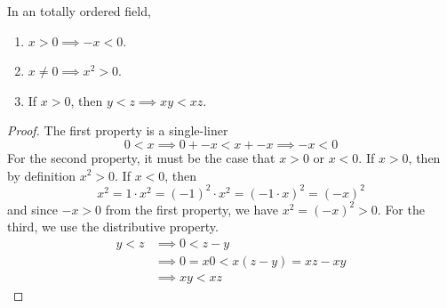   \begin{theorem}
    In an totally ordered field, 
    \begin{enumerate}
      \item $x > 0 \implies -x < 0$. 
      \item $x \neq 0 \implies x^2 > 0$. 
      \item If $x > 0$, then $y < z \implies xy < xz$. 
    \end{enumerate}
  \end{theorem} 
  \begin{proof}
    The first property is a single-liner 
    \begin{equation}
      0 < x \implies 0 + -x < x + -x \implies -x < 0 
    \end{equation}
    For the second property, it must be the case that $x > 0$ or $x < 0$. If $x > 0$, then by definition $x^2 > 0$. If $x < 0$, then 
    \begin{equation}
      x^2 = 1 \cdot x^2 = (-1)^2 \cdot x^2 = (-1 \cdot x)^2 = (-x)^2
    \end{equation}
    and since $-x > 0$ from the first property, we have $x^2 = (-x)^2 > 0$. For the third, we use the distributive property. 
    \begin{align}
      y < z & \implies 0 < z - y \\ 
            & \implies 0 = x 0 < x(z - y) = xz - xy \\
            & \implies xy < xz
    \end{align}
  \end{proof}

